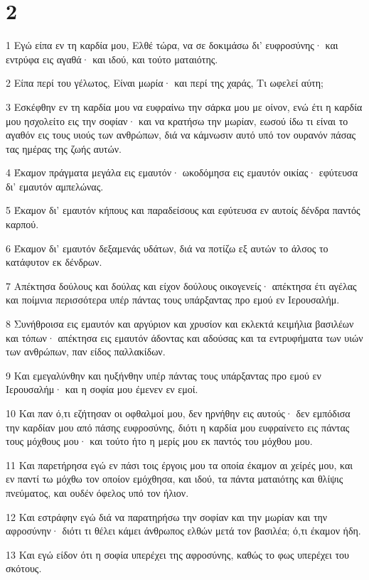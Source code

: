 \chapter{2}

\par 1 Εγώ είπα εν τη καρδία μου, Ελθέ τώρα, να σε δοκιμάσω δι' ευφροσύνης· και εντρύφα εις αγαθά· και ιδού, και τούτο ματαιότης.
\par 2 Είπα περί του γέλωτος, Είναι μωρία· και περί της χαράς, Τι ωφελεί αύτη;
\par 3 Εσκέφθην εν τη καρδία μου να ευφραίνω την σάρκα μου με οίνον, ενώ έτι η καρδία μου ησχολείτο εις την σοφίαν· και να κρατήσω την μωρίαν, εωσού ίδω τι είναι το αγαθόν εις τους υιούς των ανθρώπων, διά να κάμνωσιν αυτό υπό τον ουρανόν πάσας τας ημέρας της ζωής αυτών.
\par 4 Έκαμον πράγματα μεγάλα εις εμαυτόν· ωκοδόμησα εις εμαυτόν οικίας· εφύτευσα δι' εμαυτόν αμπελώνας.
\par 5 Έκαμον δι' εμαυτόν κήπους και παραδείσους και εφύτευσα εν αυτοίς δένδρα παντός καρπού.
\par 6 Έκαμον δι' εμαυτόν δεξαμενάς υδάτων, διά να ποτίζω εξ αυτών το άλσος το κατάφυτον εκ δένδρων.
\par 7 Απέκτησα δούλους και δούλας και είχον δούλους οικογενείς· απέκτησα έτι αγέλας και ποίμνια περισσότερα υπέρ πάντας τους υπάρξαντας προ εμού εν Ιερουσαλήμ.
\par 8 Συνήθροισα εις εμαυτόν και αργύριον και χρυσίον και εκλεκτά κειμήλια βασιλέων και τόπων· απέκτησα εις εμαυτόν άδοντας και αδούσας και τα εντρυφήματα των υιών των ανθρώπων, παν είδος παλλακίδων.
\par 9 Και εμεγαλύνθην και ηυξήνθην υπέρ πάντας τους υπάρξαντας προ εμού εν Ιερουσαλήμ· και η σοφία μου έμενεν εν εμοί.
\par 10 Και παν ό,τι εζήτησαν οι οφθαλμοί μου, δεν ηρνήθην εις αυτούς· δεν εμπόδισα την καρδίαν μου από πάσης ευφροσύνης, διότι η καρδία μου ευφραίνετο εις πάντας τους μόχθους μου· και τούτο ήτο η μερίς μου εκ παντός του μόχθου μου.
\par 11 Και παρετήρησα εγώ εν πάσι τοις έργοις μου τα οποία έκαμον αι χείρές μου, και εν παντί τω μόχθω τον οποίον εμόχθησα, και ιδού, τα πάντα ματαιότης και θλίψις πνεύματος, και ουδέν όφελος υπό τον ήλιον.
\par 12 Και εστράφην εγώ διά να παρατηρήσω την σοφίαν και την μωρίαν και την αφροσύνην· διότι τι θέλει κάμει άνθρωπος ελθών μετά τον βασιλέα; ό,τι έκαμον ήδη.
\par 13 Και εγώ είδον ότι η σοφία υπερέχει της αφροσύνης, καθώς το φως υπερέχει του σκότους.
